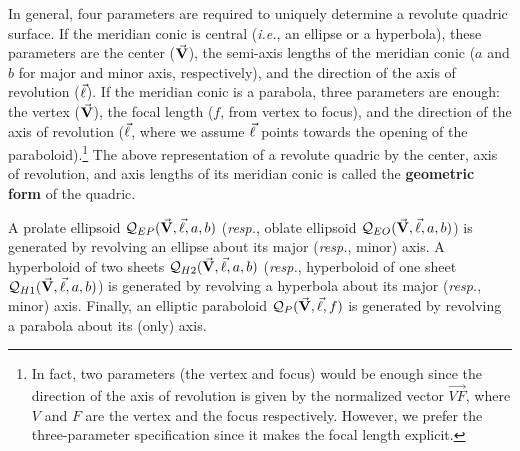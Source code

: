 \begin{definition}
\label{defn:geom}
     In general, four parameters are required to uniquely determine a revolute
quadric surface.  If the meridian conic is central ({\em i.e.}, an ellipse or a
hyperbola), these parameters are the center ($\vec{\bf V}$),
the semi-axis lengths of the meridian conic ($a$ and $b$ for major and minor
axis, respectively),
and the direction of the axis of revolution ($\vec{\bf \ell}$).
If the meridian conic is a parabola, three parameters are enough: the vertex
($\vec{\bf V}$), the focal length ($f$, from vertex to focus),
and the direction of the axis of revolution ($\vec{\bf \ell}$, where we
assume $\vec{\bf \ell}$ points towards the opening of the
paraboloid).\footnote{In fact, two parameters (the vertex and focus) would be
enough since the direction of the axis of revolution
is given by the normalized vector $\stackrel{\longrightarrow}{VF}$, where
$V$ and $F$ are the vertex and the focus respectively.  However, we prefer the
three-parameter specification since it makes the focal length explicit.}
The above representation of a revolute quadric by the center, axis of
revolution, and axis lengths of its meridian conic is called the
{\bf geometric form} of the quadric.
\end{definition}

     A prolate ellipsoid ${\cal Q}_{EP}(\vec{\bf V},\vec{\bf \ell},a,b)$
({\em resp.}, oblate ellipsoid ${\cal Q}_{EO}(\vec{\bf V},\vec{\bf \ell},a,b)$)
is generated by revolving an ellipse about its major ({\em resp.}, minor) axis.
A hyperboloid of two sheets ${\cal Q}_{H2}(\vec{\bf V},\vec{\bf \ell},a,b)$
({\em resp.}, hyperboloid of one sheet
${\cal Q}_{H1}(\vec{\bf V},\vec{\bf \ell},a,b)$)
is generated by revolving
a hyperbola about its major ({\em resp.}, minor) axis.
Finally, an elliptic paraboloid ${\cal Q}_P(\vec{\bf V},\vec{\bf \ell},f)$
is generated by revolving a parabola about its (only) axis.

